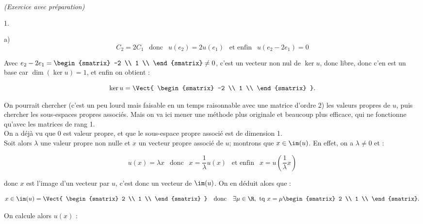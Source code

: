 \documentclass[11pt]{article}%
\begin{document}
\begin{exercice}{\it (Exercice avec préparation)}
\begin{noliste}{1.}
\begin{noliste}{a)}
\[
 C_{2} = 2 C_{1} \ \ \text{ donc } \ \ u ( e_{2} ) = 2 u( e_{1} ) \ \
\text{ et enfin } \ \ u ( e_{2} - 2 e_{1} ) = 0 
\]

 Avec $e_{2} - 2 e_{1} = \begin{smatrix}
-2 \\
1 \\
\end{smatrix}
\neq 0$,
 c'est un vecteur non nul de $\ker u$, donc libre, donc c'en est un
 base car $\dim ( \ker u ) = 1$, et enfin on obtient :
 
\[
 \ker u = \Vect { \begin{smatrix}
-2 \\
1 \\
\end{smatrix}
}. 
\]

 \item On pourrait chercher (c'est un peu lourd mais faisable en un
temps raisonnable avec une matrice d'ordre 2) les valeurs propres de
$u$, puis chercher les sous-espaces propres associés. Mais on va ici
mener une méthode plus originale et beaucoup plus efficace, qui ne
fonctionne qu'avec les matrices de rang 1. \\

 On a déjà vu que 0 est valeur propre, et que le sous-espace propre
associé est de dimension 1. \\

 Soit alors $\lambda$ une valeur propre non nulle et $ x$ un vecteur
propre associé de $u$; montrons que $x \in \im(u)$. En effet, on a
$\lambda \neq 0$ et : 
 
\[
 u (x) = \lambda x \ \ \text{ donc } \ \ x = \frac{ 1 }{ \lambda } u
(x) \ \ \text{ et enfin } \ \ x = u \left( \frac{ 1 }{ \lambda } x
\right) 
\]

 donc $x$ est l'image d'un vecteur par $u$, c'est donc un vecteur de
$\im(u)$. On en déduit alors que : 
 
\[
 x \in \im(u) = \Vect { \begin{smatrix}
2 \\
1 \\
\end{smatrix}
} \ \ \text{ donc } \ \ \exists \mu \in \R, \text{ tq } x = \mu
\begin{smatrix}
2 \\
1 \\
\end{smatrix}. 
\]

 On calcule alors $u(x)$ : 
 

\end{noliste}
\end{noliste}
\end{exercice}
\end{document}
